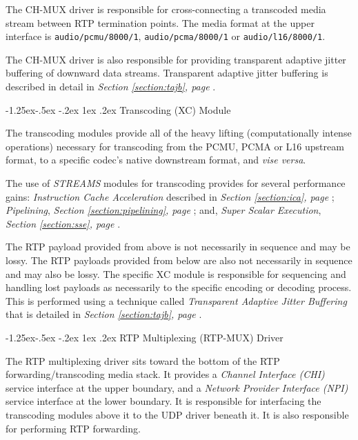 \documentclass[letterpaper,final,notitlepage,twocolumn,10pt,twoside]{article}
\makeatletter
\let\normalsize = \small
\let\small = \footnotesize
\let\footnotesize = \scriptsize
\let\scriptsize = \tiny
\renewcommand\subsubsection{\@startsection{subsubsection}{3}{\z@}%
                                     {-1.25ex\@plus -.5ex \@minus -.2ex}%
                                     {1ex \@plus .2ex}%
                                     {\normalfont\normalsize\bfseries}}
\makeatother
\begin{document}
The CH-MUX driver is responsible for cross-connecting a transcoded media stream
between RTP termination points.  The media format at the upper interface is
\texttt{audio/pcmu/8000/1}, \texttt{audio/pcma/8000/1} or
\texttt{audio/l16/8000/1}.

The CH-MUX driver is also responsible for providing transparent adaptive jitter
buffering of downward data streams.  Transparent adaptive jitter buffering is
described in detail in {\sl Section \ref{section:tajb}, page
\pageref{section:tajb}}.

\subsubsection{Transcoding (XC) Module}
\label{section:xc}

The transcoding modules provide all of the heavy lifting (computationally
intense operations) necessary for transcoding from the PCMU, PCMA or L16
upstream format, to a specific codec's native downstream format, and {\it vise
versa}.

The use of {\sl STREAMS} modules for transcoding provides for several
performance gains: {\it Instruction Cache Acceleration} described in {\sl
Section \ref{section:ica}, page \pageref{section:ica}}; {\it Pipelining}, {\sl
Section \ref{section:pipelining}, page \pageref{section:pipelining}}; and, {\it
Super Scalar Execution}, {\sl Section \ref{section:sse}, page
\pageref{section:sse}}.

The RTP payload provided from above is not necessarily in sequence and may be
lossy.  The RTP payloads provided from below are also not necessarily in
sequence and may also be lossy.  The specific XC module is responsible for
sequencing and handling lost payloads as necessarily to the specific encoding or
decoding process.  This is performed using a technique called {\it Transparent
Adaptive Jitter Buffering} that is detailed in \textsl{Section
\ref{section:tajb}, page \pageref{section:tajb}}.

\subsubsection{RTP Multiplexing (RTP-MUX) Driver}
\label{section:rtpmux}

The RTP multiplexing driver sits toward the bottom of the RTP
forwarding/transcoding media stack.  It provides a \textsl{Channel Interface
(CHI)} \cite[]{CHI} service interface at the upper boundary, and a
\textsl{Network Provider Interface (NPI)} \cite[]{NPI} service interface at the
lower boundary.  It is responsible for interfacing the transcoding modules above
it to the UDP driver beneath it.  It is also responsible for performing RTP
forwarding.
\end{document}
